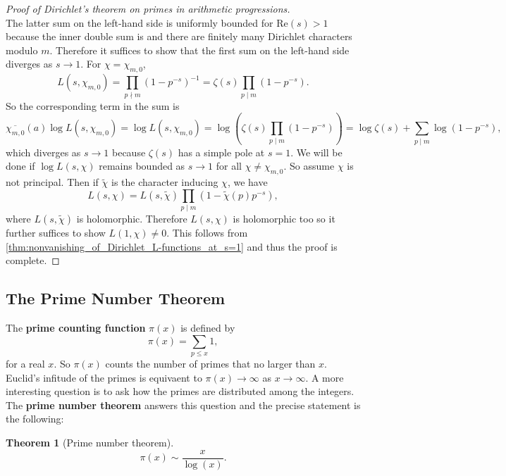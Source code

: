 \documentclass[12pt]{book}
\newtheorem{theorem}{Theorem}[section]
\theoremstyle{definition}\newframedtheorem{method}{Method}
\newcommand{\z}{\zeta}
\newcommand{\<}{\langle}
\renewcommand{\>}{\rangle}
\newcommand{\wtilde}{\widetilde}
\newcommand{\conj}{\overline}
\renewcommand{\Re}{\mathrm{Re}}
\begin{document}
\begin{proof}[Proof of Dirichlet's theorem on primes in arithmetic progressions]
\[          \]
          The latter sum on the left-hand side is uniformly bounded for $\Re(s) > 1$ because the inner double sum is and there are finitely many Dirichlet characters modulo $m$. Therefore it suffices to show that the first sum on the left-hand side diverges as $s \to 1$. For $\chi = \chi_{m,0}$,
          \[
            L(s,\chi_{m,0}) = \prod_{p \nmid m}(1-p^{-s})^{-1} = \z(s)\prod_{p \mid m}(1-p^{-s}).
          \]
          So the corresponding term in the sum is
          \[
            \conj{\chi_{m,0}}(a)\log L(s,\chi_{m,0}) = \log L(s,\chi_{m,0}) = \log\left(\z(s)\prod_{p \mid m}(1-p^{-s})\right) = \log\z(s)+\sum_{p \mid m}\log(1-p^{-s}),
          \]
          which diverges as $s \to 1$ because $\z(s)$ has a simple pole at $s = 1$. We will be done if $\log L(s,\chi)$ remains bounded as $s \to 1$ for all $\chi \neq \chi_{m,0}$. So assume $\chi$ is not principal. Then if $\wtilde{\chi}$ is the character inducing $\chi$, we have
          \[
            L(s,\chi) = L(s,\wtilde{\chi})\prod_{p \mid m}(1-\wtilde{\chi}(p)p^{-s}),
          \]
          where $L(s,\wtilde{\chi})$ is holomorphic. Therefore $L(s,\chi)$ is holomorphic too so it further suffices to show $L(1,\chi) \neq 0$. This follows from \cref{thm:nonvanishing_of_Dirichlet_L-functions_at_s=1} and thus the proof is complete.
      \end{proof}
    \subsection*{The Prime Number Theorem}
      The \textbf{prime counting function} $\pi(x)$ is defined by
      \[
        \pi(x) = \sum_{p \le x}1,
      \]
      for a real $x$. So $\pi(x)$ counts the number of primes that no larger than $x$. Euclid's infitude of the primes is equivaent to $\pi(x) \to \infty$ as $x \to \infty$. A more interesting question is to ask how the primes are distributed among the integers. The \textbf{prime number theorem} answers this question and the precise statement is the following:

      \begin{theorem}[Prime number theorem]
        \phantom{ }
        \[
          \pi(x) \sim \frac{x}{\log(x)}.
        \]
      \end{theorem}
\end{document}
